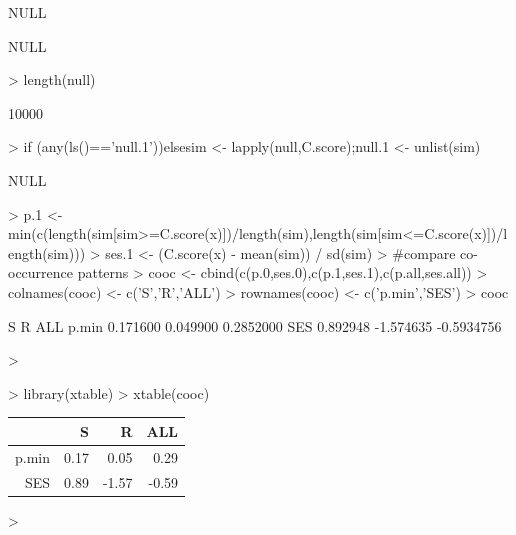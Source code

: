 \documentclass[12pt]{article}
\begin{document}
\begin{Schunk}
\begin{Sinput}
\end{Sinput}
\begin{Soutput}
NULL
\end{Soutput}
\begin{Soutput}
NULL
\end{Soutput}
\begin{Sinput}
> length(null)
\end{Sinput}
\begin{Soutput}
[1] 10000
\end{Soutput}
\begin{Sinput}
> if (any(ls()=='null.1')){}else{sim <- lapply(null,C.score);null.1 <- unlist(sim)}
\end{Sinput}
\begin{Soutput}
NULL
\end{Soutput}
\begin{Sinput}
> p.1 <- min(c(length(sim[sim>=C.score(x)])/length(sim),length(sim[sim<=C.score(x)])/length(sim)))
> ses.1 <- (C.score(x) - mean(sim)) / sd(sim)
>                                         #compare co-occurrence patterns
> cooc <- cbind(c(p.0,ses.0),c(p.1,ses.1),c(p.all,ses.all))
> colnames(cooc) <- c('S','R','ALL')
> rownames(cooc) <- c('p.min','SES')
> cooc
\end{Sinput}
\begin{Soutput}
             S         R        ALL
p.min 0.171600  0.049900  0.2852000
SES   0.892948 -1.574635 -0.5934756
\end{Soutput}
\begin{Sinput}
> 
\end{Sinput}
\end{Schunk}

\begin{Schunk}
\begin{Sinput}
> library(xtable)
> xtable(cooc)
\end{Sinput}
\begin{table}[ht]
\begin{center}
\begin{tabular}{rrrr}
  \hline
 & S & R & ALL \\ 
  \hline
p.min & 0.17 & 0.05 & 0.29 \\ 
  SES & 0.89 & -1.57 & -0.59 \\ 
   \hline
\end{tabular}
\end{center}
\end{table}\begin{Sinput}
> 
\end{Sinput}
\end{Schunk}
\end{document}
